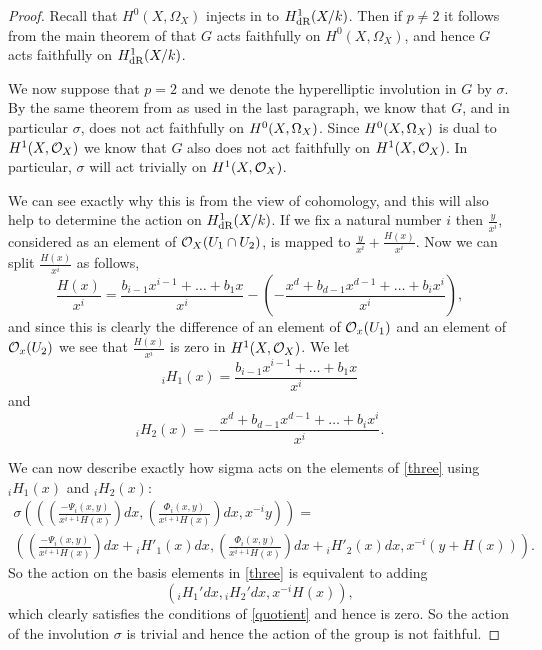 \begin{proof}
Recall that $H^0(X,\Omega_X)$ injects in to $H_{\text {dR}}^1(X/k)$.
Then if $p \neq 2$ it follows from the main theorem of \cite{faithfulaction} that $G$ acts faithfully on $H^0(X,\Omega_X)$, and hence $G$ acts faithfully on $H_{\text {dR}}^1(X/k)$.

We now suppose that $p=2$ and we denote the hyperelliptic involution in $G$ by $\sigma$.
By the same theorem from \cite{faithfulaction} as used in the last paragraph, we know that $G$, and in particular $\sigma$, does not act faithfully on ${H^0(X,\Omega_X)}$.
Since ${H^0(X,\Omega_X)}$ is dual to $H^1(X,\mathcal{O}_X)$ we know that $G$ also does not act faithfully on $H^1(X,\mathcal{O}_X)$.
In particular, $\sigma$ will act trivially on $H^1(X,\mathcal{O}_X)$.

We can see exactly why this is from the view of \cech cohomology, and this will also help to determine the action on $H_{\text {dR}}^1(X/k)$.
If we fix a natural number $i$ then $\frac{y}{x^i}$, considered as an element of ${\cal O}_X(U_1\cap U_2)$, is mapped to $\frac{y}{x^i} + \frac{H(x)}{x^i}$. 
Now we can split $\frac{H(x)}{x^i}$ as follows, 
\begin{equation*}
\frac{H(x)}{x^i} =  \frac{b_{i-1}x^{i-1} + \ldots + b_1x}{x^i} - \left( - \frac{x^d + b_{d-1}x^{d-1} + \ldots + b_ix^i}{x^i} \right),
\end{equation*}
and since this is clearly the difference of an element of ${\cal O}_x(U_1)$ and an element of ${\cal O}_x(U_2)$ we see that $\frac{H(x)}{x^i}$ is zero in $H^1(X,\mathcal{O}_X)$.
We let 
\[
{}_iH_1(x) = \frac{b_{i-1}x^{i-1} + \ldots + b_1x}{x^i}
\]
and 
\[
{}_iH_2(x) = - \frac{x^d + b_{d-1}x^{d-1} + \ldots + b_ix^i}{x^i}.
\]

We can now describe exactly how sigma acts on the elements of \eqref{three} using ${}_iH_1(x)$ and ${}_iH_2(x)$:
\begin{multline}
\sigma \left( \left( \left(\frac{-\Psi_i(x,y)}{x^{i+1}H(x)}\right) dx, \left( \frac{\Phi_i(x,y)}{x^{i+1}H(x)} \right) dx, x^{-i}y \right)\right) = \\
 \left( \left(\frac{-\Psi_i(x,y)}{x^{i+1}H(x)} \right) dx + {}_iH'_1(x)dx,  \left( \frac{\Phi_i(x,y)}{x^{i+1}H(x)} \right) dx+ {}_iH'_2(x)dx, x^{-i}(y+H(x)) \right).
\end{multline}
So the action on the basis elements in \eqref{three} is equivalent to adding 
\[
\left( {}_iH_1'dx, {}_iH_2'dx, x^{-i}H(x) \right),
\]
which clearly satisfies the conditions of \eqref{quotient} and hence is zero.
So the action of the involution $\sigma$ is trivial and hence the action of the group is not faithful.
\begin{comment}
Hence the action is trivial if and only if ${}_iH_1'(x)dx = {}_iH_2'(x)dx =0$.
This cannot happen though, since we can always find an $l\in \{0,1\}$ such that $l \not\equiv d\ \text{mod}\ 2$, and then $d\left({}_iH_2(x)\right) = {}_iH_2'(x)dx \neq 0$, as we can see from the leading term (unless of course $d$ is zero, in which case $d\left({}_iH_1(x)\right) \neq 0$).
\end{comment}
\end{proof}


